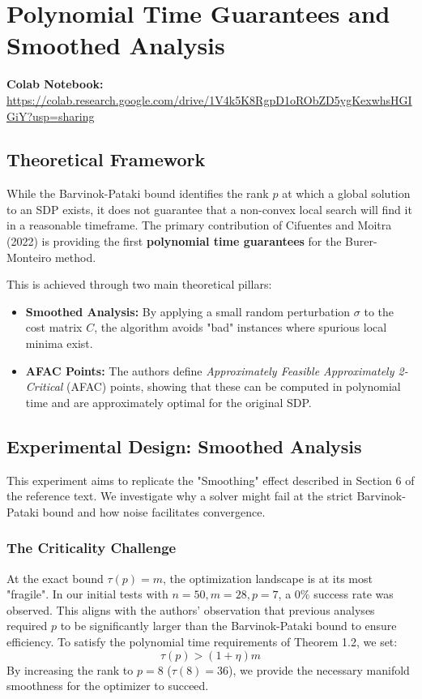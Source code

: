 \section{Polynomial Time Guarantees and Smoothed Analysis}

\textbf{Colab Notebook:} \url{https://colab.research.google.com/drive/1V4k5K8RgpD1oRObZD5ygKexwhsHGIGiY?usp=sharing}

\subsection{Theoretical Framework}
While the Barvinok-Pataki bound identifies the rank $p$ at which a global solution to an SDP exists, it does not guarantee that a non-convex local search will find it in a reasonable timeframe. The primary contribution of Cifuentes and Moitra (2022) is providing the first \textbf{polynomial time guarantees} for the Burer-Monteiro method.

This is achieved through two main theoretical pillars:
\begin{itemize}
    \item \textbf{Smoothed Analysis:} By applying a small random perturbation $\sigma$ to the cost matrix $C$, the algorithm avoids "bad" instances where spurious local minima exist. 
    \item \textbf{AFAC Points:} The authors define \textit{Approximately Feasible Approximately 2-Critical} (AFAC) points, showing that these can be computed in polynomial time and are approximately optimal for the original SDP.
\end{itemize}

\subsection{Experimental Design: Smoothed Analysis}
This experiment aims to replicate the "Smoothing" effect described in Section 6 of the reference text. We investigate why a solver might fail at the strict Barvinok-Pataki bound and how noise facilitates convergence.

\subsubsection{The Criticality Challenge}
At the exact bound $\tau(p) = m$, the optimization landscape is at its most "fragile". In our initial tests with $n=50, m=28, p=7$, a $0\%$ success rate was observed. This aligns with the authors' observation that previous analyses required $p$ to be significantly larger than the Barvinok-Pataki bound to ensure efficiency. To satisfy the polynomial time requirements of Theorem 1.2, we set:
\begin{equation}
    \tau(p) > (1+\eta)m
\end{equation}
By increasing the rank to $p=8$ ($\tau(8)=36$), we provide the necessary manifold smoothness for the optimizer to succeed.

